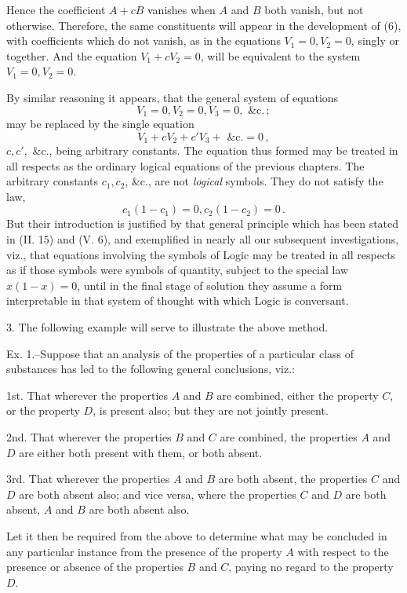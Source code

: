 \documentclass[oneside]{book}
\begin{document}
Hence the coefficient $A + cB$ vanishes when $A$ and $B$ both
vanish, but not otherwise. Therefore, the same constituents
will appear in the development of (6), with coefficients which do
not vanish, as in the equations $V_1 = 0, V_2 = 0$, singly or together.
And the equation $V_1 + c V_2 = 0$, will be equivalent to the system
$V_1 = 0, V_2 = 0$.

By similar reasoning it appears, that the general system of
equations
\[
V_1 = 0, V_2 = 0, V_3 = 0, \textrm{ \&c.}\,;
\]
may be replaced by the single equation
\[
V_1 + cV_2 + c'V_3 + \textrm{ \&c.} = 0\,,
\]
$c, c',$ \&c., being arbitrary constants. The equation thus formed
may be treated in all respects as the ordinary logical equations
of the previous chapters. The arbitrary constants $c_1, c_2$, \&c., are
not \textit{logical} symbols. They do not satisfy the law,
\[
c_1 (1 - c_1) = 0, c_2 (1 - c_2) = 0\,.
\]
But their introduction is justified by that general principle which
has been stated in (II. 15) and (V. 6), and exemplified in nearly
all our subsequent investigations, viz., that equations involving
the symbols of Logic may be treated in all respects as if those
symbols were symbols of quantity, subject to the special law
$x (1 - x) = 0$, until in the final stage of solution they assume a
form interpretable in that system of thought with which Logic
is conversant.

3. The following example will serve to illustrate the above
method.

Ex. 1.--Suppose that an analysis of the properties of a particular
class of substances has led to the following general conclusions,
viz.:

1st. That wherever the properties $A$ and $B$ are combined,
either the property $C$, or the property $D$, is present also; but
they are not jointly present.

2nd. That wherever the properties $B$ and $C$ are combined,
the properties $A$ and $D$ are either both present with them, or
both absent.

3rd. That wherever the properties $A$ and $B$ are both absent,
the properties $C$ and $D$ are both absent also; and vice versa, where
the properties $C$ and $D$ are both absent, $A$ and $B$ are both absent
also.

Let it then be required from the above to determine what
may be concluded in any particular instance from the presence of
the property $A$ with respect to the presence or absence of the
properties $B$ and $C$, paying no regard to the property $D$.
\end{document}
